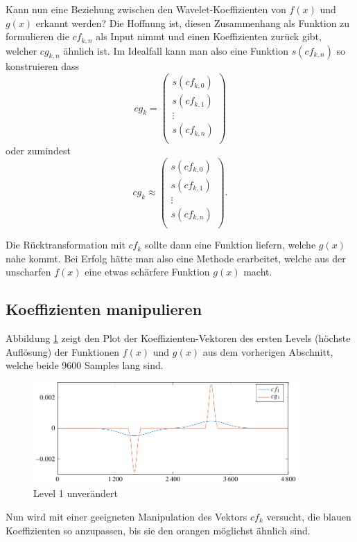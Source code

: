Kann nun eine Beziehung zwischen den Wavelet-Koeffizienten von $f(x)$ und $g(x)$ erkannt werden?
Die Hoffnung ist, diesen Zusammenhang als Funktion zu formulieren die $cf_{k,n}$ als Input nimmt und einen Koeffizienten zurück gibt, welcher $cg_{k,n}$ ähnlich ist.
Im Idealfall kann man also eine Funktion $s(cf_{k,n})$ so konstruieren dass
$$cg_k = \left(\begin{array}{c}
	s(cf_{k,0})\\
	s(cf_{k,1})\\
	\vdots\\
	s(cf_{k,n})\\
\end{array} \right)$$
oder zumindest
$$cg_k \approx \left(\begin{array}{c}
	s(cf_{k,0})\\
	s(cf_{k,1})\\
	\vdots\\
	s(cf_{k,n})\\
\end{array} \right).$$

Die Rücktransformation mit $cf_k$ sollte dann eine Funktion liefern, welche $g(x)$ nahe kommt.
Bei Erfolg hätte man also eine Methode erarbeitet, welche aus der \glqq unscharfen\grqq{} $f(x)$ eine etwas \glqq schärfere\grqq{} Funktion $g(x)$ macht. 

\subsection{Koeffizienten manipulieren}
Abbildung \ref{deconvolve:level1} zeigt den Plot der Koeffizienten-Vektoren des ersten Levels (höchste Auflösung) der Funktionen $f(x)$ und $g(x)$ aus dem vorherigen Abschnitt, welche beide 9600 Samples lang sind.
\begin{figure}
\centering
\includegraphics[width=0.9\textwidth]{./papers/deconvolve/pictures/level/level1.pdf}
\caption{Level 1 unverändert\label{deconvolve:level1}}
\end{figure}

Nun wird mit einer geeigneten Manipulation des Vektors $cf_k$ versucht, die blauen Koeffizienten so anzupassen, bis sie den orangen möglichst ähnlich sind.

